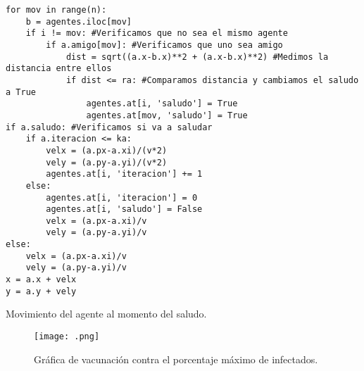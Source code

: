 \documentclass{article}
\begin{document}
\renewcommand{\listingscaption}{Código}
\begin{listing}[H]
  \begin{verbatim}
for mov in range(n):
    b = agentes.iloc[mov]
    if i != mov: #Verificamos que no sea el mismo agente
        if a.amigo[mov]: #Verificamos que uno sea amigo
            dist = sqrt((a.x-b.x)**2 + (a.x-b.x)**2) #Medimos la distancia entre ellos
            if dist <= ra: #Comparamos distancia y cambiamos el saludo a True
                agentes.at[i, 'saludo'] = True
                agentes.at[mov, 'saludo'] = True
if a.saludo: #Verificamos si va a saludar
    if a.iteracion <= ka:
        velx = (a.px-a.xi)/(v*2)
        vely = (a.py-a.yi)/(v*2)
        agentes.at[i, 'iteracion'] += 1
    else:
        agentes.at[i, 'iteracion'] = 0
        agentes.at[i, 'saludo'] = False
        velx = (a.px-a.xi)/v
        vely = (a.py-a.yi)/v
else:
    velx = (a.px-a.xi)/v
    vely = (a.py-a.yi)/v
x = a.x + velx
y = a.y + vely
  \end{verbatim}
  \label{lst:fibo}
  \caption{Movimiento del agente al momento del saludo.}
\end{listing}


\begin{figure}[H]
\centering
\texttt{[image: .png]}
\caption{\label{fig3}Gráfica de vacunación contra el porcentaje máximo de infectados.}
\end{figure}

\printbibliography
\end{document}
